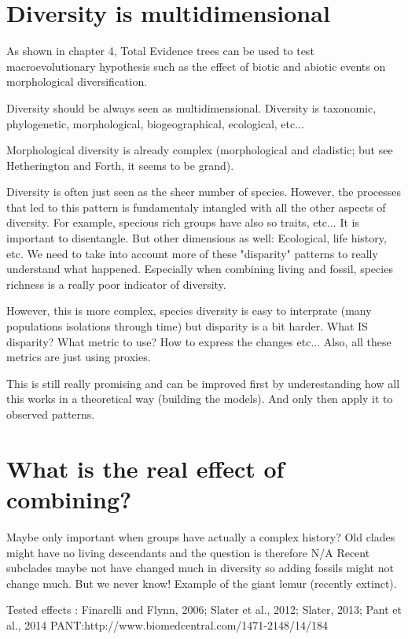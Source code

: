 \section{Diversity is multidimensional}
As shown in chapter 4, Total Evidence trees can be used to test macroevolutionary hypothesis such as the effect of biotic and abiotic events on morphological diversification.


Diversity should be always seen as multidimensional.
Diversity is taxonomic, phylogenetic, morphological, biogeographical, ecological, etc...

Morphological diversity is already complex (morphological and cladistic; but see Hetherington and Forth, it seems to be grand).

Diversity is often just seen as the sheer number of species.
However, the processes that led to this pattern is fundamentaly intangled with all the other aspects of diversity.
For example, specious rich groups have also so traits, etc...
It is important to disentangle.
But other dimensions as well: Ecological, life history, etc.
We need to take into account more of these "disparity" patterns to really understand what happened.
Especially when combining living and fossil, species richness is a really poor indicator of diversity.

However, this is more complex, species diversity is easy to interprate (many populations isolations through time) but disparity is a bit harder.
What IS disparity? What metric to use? How to express the changes etc...
Also, all these metrics are just using proxies.

This is still really promising and can be improved first by underestanding how all this works in a theoretical way (building the models).
And only then apply it to observed patterns.

\section{What is the real effect of combining?}
Maybe only important when groups have actually a complex history?
Old clades might have no living descendants and the question is therefore N/A
Recent subclades maybe not have changed much in diversity so adding fossils might not change much.
But we never know! Example of the giant lemur (recently extinct).

Tested effects : Finarelli and Flynn, 2006; Slater et al., 2012; Slater, 2013; Pant et al., 2014   PANT:http://www.biomedcentral.com/1471-2148/14/184


